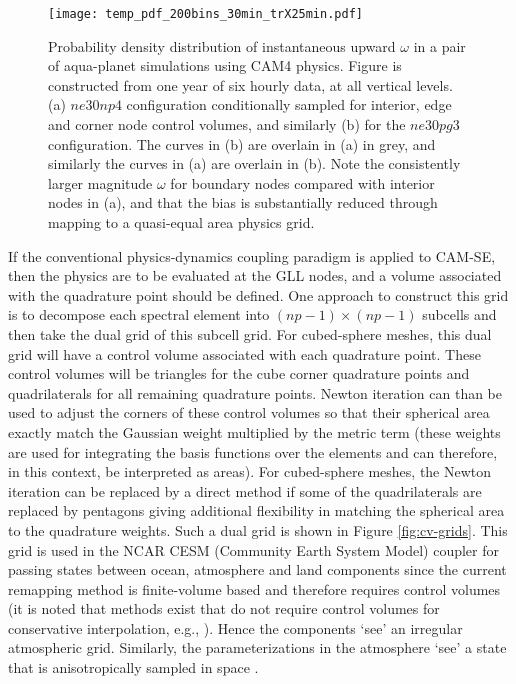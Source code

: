 \documentclass{ametsoc}
\begin{document}
\begin{figure}[t]
\begin{center}
\noindent\texttt{[image: temp\_pdf\_200bins\_30min\_trX25min.pdf]}\\
\end{center}
\caption{Probability density distribution of instantaneous upward $\omega$ in a pair of aqua-planet simulations using CAM4 physics. Figure is constructed from one year of six hourly data, at all vertical levels. (a) $ne30np4$ configuration conditionally sampled for interior, edge and corner node control volumes, and similarly (b) for the $ne30pg3$ configuration. The curves in (b) are overlain in (a) in grey, and similarly the curves in (a) are overlain in (b). Note the consistently larger magnitude $\omega$ for boundary nodes compared with interior nodes in (a), and that the bias is substantially reduced through mapping to a quasi-equal area physics grid.}\label{fig:omega-se-volumes}
\end{figure}

If the conventional physics-dynamics coupling paradigm is applied to CAM-SE, then the physics are to be evaluated at the GLL nodes, and a volume associated with the quadrature point should be defined. One approach to construct this grid is to decompose each spectral element into $(np-1) \times (np-1)$ subcells and then take the dual grid of this subcell grid.  For cubed-sphere meshes, this dual grid will have a control volume associated with each quadrature point. These control volumes will be triangles for the cube corner quadrature points and quadrilaterals for all remaining quadrature points.  Newton iteration can than be used to adjust the corners of these control volumes so that their spherical area exactly match the Gaussian weight multiplied by the metric term (these weights are used for integrating the basis functions over the elements and can therefore, in this context, be interpreted as areas).  For cubed-sphere meshes, the Newton iteration can be replaced by a direct method if some of the quadrilaterals are replaced by pentagons giving additional flexibility in matching the spherical area to the quadrature weights. Such a dual grid is shown in Figure \ref{fig:cv-grids}. This grid is used in the NCAR CESM (Community Earth System Model) coupler for passing states between ocean, atmosphere and land components since the current remapping method is finite-volume based and therefore requires control volumes (it is noted that methods exist that do not require control volumes for conservative interpolation, e.g., \cite{UT2015MWR}). Hence the components `see' an irregular atmospheric grid. Similarly, the parameterizations in the atmosphere `see' a state that is anisotropically sampled in space \citep[see Figure 1 and 5 in ][]{KetAl2008JGR}.
\end{document}
